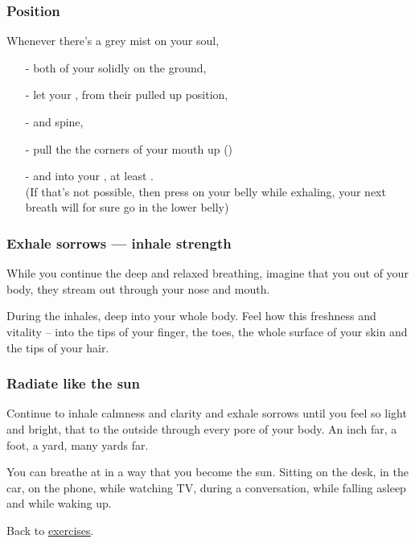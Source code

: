 

\begin{frame}
\frametitle{Position}
Whenever there's a grey mist on your soul,
\begin{itemize}
\item[-]  both of your  solidly on the ground, 
\item[-] let your , from their pulled up position,
\item[-]  and spine, 
\item[-] pull the the corners of your mouth up ()
\item[-] and  into your , at least . \\
(If that's not possible, then press on your belly while exhaling, your next breath will for sure go in the lower belly)
\end{itemize}
\end{frame}
\begin{frame}
\frametitle{Exhale sorrows --- inhale strength}
While you continue the deep and relaxed breathing, imagine that you  out of your body, they stream out through your nose and mouth.

During the inhales,  deep into your whole body. Feel how this freshness and vitality  -- into the tips of your finger, the toes, the whole surface of your skin and the tips of your hair.
\end{frame}
\begin{frame}
\frametitle{Radiate like the sun}
Continue to inhale calmness and clarity and exhale sorrows until you feel so light and bright, that  to the outside through every pore of your body. An inch far, a foot, a yard, many yards far.

You can breathe at  in a way that you become the sun. Sitting on the desk, in the car, on the phone, while watching TV, during a conversation, while falling asleep and while waking up.

\vspace{1cm}
Back to \href{run:./Exercises.pdf}{\underline{exercises}}.
\end{frame}
